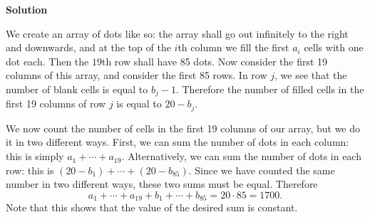 \begin{enumerate}
 



\textbf{Solution}

We create an array of dots like so: the array shall go out infinitely to the right and downwards, and at the top of the $i$th column we fill the first $a_i$ cells with one dot each. Then the $19$th row shall have 85 dots. Now consider the first 19 columns of this array, and consider the first 85 rows. In row $j$, we see that the number of blank cells is equal to $b_j-1$. Therefore the number of filled cells in the first 19 columns of row $j$ is equal to $20-b_j$.

 We now count the number of cells in the first 19 columns of our array, but we do it in two different ways. First, we can sum the number of dots in each column: this is simply $a_1+\cdots+a_{19}$. Alternatively, we can sum the number of dots in each row: this is $(20-b_1)+\cdots +(20-b_{85})$. Since we have counted the same number in two different ways, these two sums must be equal. Therefore
 \[a_1+\cdots +a_{19}+b_1+\cdots +b_{85}=20\cdot 85=\boxed{1700}.\]Note that this shows that the value of the desired sum is constant.

 


\end{enumerate}